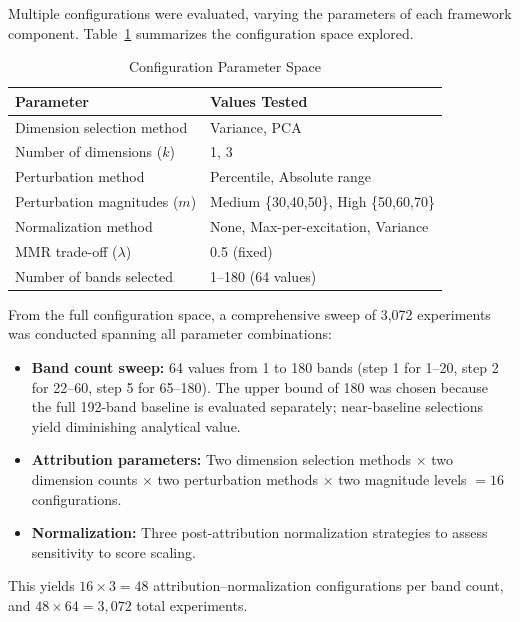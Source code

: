 Multiple configurations were evaluated, varying the parameters of each framework component.
Table~\ref{tab:configs} summarizes the configuration space explored.

\begin{table}[!t]
\centering
\caption{Configuration Parameter Space}
\label{tab:configs}
\begin{tabular}{@{}ll@{}}
\toprule
\textbf{Parameter} & \textbf{Values Tested} \\
\midrule
Dimension selection method & Variance, PCA \\
Number of dimensions ($k$) & 1, 3 \\
Perturbation method & Percentile, Absolute range \\
Perturbation magnitudes ($m$) & Medium \{30,40,50\}, High \{50,60,70\} \\
Normalization method & None, Max-per-excitation, Variance \\
MMR trade-off ($\lambda$) & 0.5 (fixed) \\
Number of bands selected & 1--180 (64 values) \\
\bottomrule
\end{tabular}
\end{table}

From the full configuration space, a comprehensive sweep of 3,072 experiments was conducted spanning all parameter combinations:
\begin{itemize}
    \item \textbf{Band count sweep:} 64 values from 1 to 180 bands (step 1 for 1--20, step 2 for 22--60, step 5 for 65--180). The upper bound of 180 was chosen because the full 192-band baseline is evaluated separately; near-baseline selections yield diminishing analytical value.
    \item \textbf{Attribution parameters:} Two dimension selection methods $\times$ two dimension counts $\times$ two perturbation methods $\times$ two magnitude levels $= 16$ configurations.
    \item \textbf{Normalization:} Three post-attribution normalization strategies to assess sensitivity to score scaling.
\end{itemize}
This yields $16 \times 3 = 48$ attribution--normalization configurations per band count, and $48 \times 64 = 3{,}072$ total experiments.

